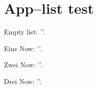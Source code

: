 \documentclass[a4paper]{article}
\def\testsubsection#1{\message{STARTING TEST SUBSECTION '#1'}\subsection{#1}}
\begin{document}
% 
% 
% 
% 
% 
% 
% 
% 
% 
% 
% 
% 
% 
% 
% 


\section{App--list test}
{

\pgfplotsapplistnewempty\foolist

\pgfplotsapplistedefcontenttomacro\foolist\to\content
Empty list: '\content'.

\pgfplotsapplistpushback Eins\to\foolist
\pgfplotsapplistedefcontenttomacro\foolist\to\content
Now: '\content'.

\pgfplotsapplistpushback Zwei\to\foolist
\pgfplotsapplistedefcontenttomacro\foolist\to\content
Now: '\content'.

\pgfplotsapplistpushback Drei\to\foolist
\pgfplotsapplistedefcontenttomacro\foolist\to\content
Now: '\content'.
}

% 
\end{document}
